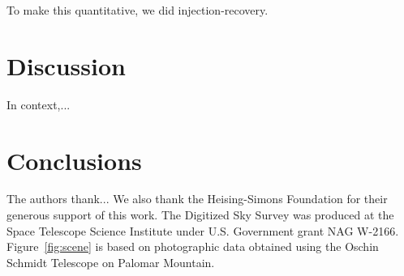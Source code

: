 \documentclass[12pt,twocolumn,tighten]{aastex62}
\begin{document}
To make this quantitative, we did injection-recovery.



\section{Discussion}
\label{sec:discussion}

In context,...


\section{Conclusions}
\label{sec:conclusions}





\acknowledgements
%
%
%
The authors thank...
%
We also thank the Heising-Simons Foundation for
their generous support of this work.
%
The Digitized Sky Survey was produced at the Space Telescope Science
Institute under U.S. Government grant NAG W-2166.
Figure~\ref{fig:scene} is based on photographic data obtained using
the Oschin Schmidt Telescope on Palomar Mountain.
%
\end{document}
